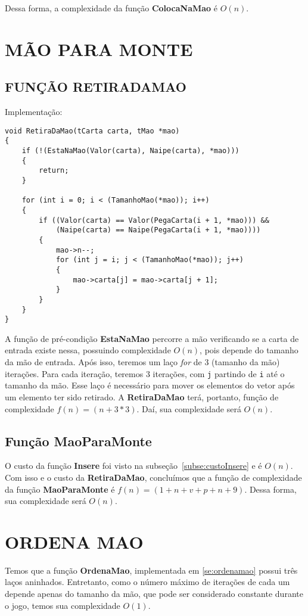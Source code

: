 \documentclass[12pt, oneside, a4paper, brazil]{abntex2}
\begin{document}
Dessa forma, a complexidade da função \textbf{ColocaNaMao} é $O(n)$.

\section{MÃO PARA MONTE}
\subsection{FUNÇÃO RETIRADAMAO}
Implementação:
\begin{lstlisting}
void RetiraDaMao(tCarta carta, tMao *mao)
{
    if (!(EstaNaMao(Valor(carta), Naipe(carta), *mao)))
    {
        return;
    }

    for (int i = 0; i < (TamanhoMao(*mao)); i++)
    {
        if ((Valor(carta) == Valor(PegaCarta(i + 1, *mao))) &&
            (Naipe(carta) == Naipe(PegaCarta(i + 1, *mao))))
        {
            mao->n--;
            for (int j = i; j < (TamanhoMao(*mao)); j++)
            {
                mao->carta[j] = mao->carta[j + 1];
            }
        }
    }
}
\end{lstlisting}
A função de pré-condição \textbf{EstaNaMao} percorre a mão verificando se a carta de entrada existe nessa, possuindo complexidade $O(n)$, pois depende do tamanho da mão de entrada.
Após isso, teremos um laço \textit{for} de 3 (tamanho da mão) iterações. Para cada iteração, teremos 3 iterações, com \texttt{j} partindo de \texttt{i} até o tamanho da mão. Esse laço é necessário para mover os elementos do vetor após um elemento ter sido retirado.
A \textbf{RetiraDaMao} terá, portanto, função de complexidade $f (n) = (n + 3 * 3)$. Daí, sua complexidade será $O(n)$.

\subsection{Função MaoParaMonte}
O custo da função \textbf{Insere} foi visto na subseção~\ref{subse:custoInsere} e é $O(n)$. Com isso e o custo da \textbf{RetiraDaMao}, concluímos que a função de complexidade da função \textbf{MaoParaMonte} é $ f(n) = (1 + n + v + p + n + 9)$. Dessa forma, sua complexidade será $O(n)$.


\section{ORDENA MAO}

Temos que a função \textbf{OrdenaMao}, implementada em \ref{se:ordenamao} possui três laços aninhados. Entretanto, como o número máximo de iterações de cada um depende apenas do tamanho da mão, que pode ser considerado constante durante o jogo, temos sua complexidade $O(1)$.
\end{document}
